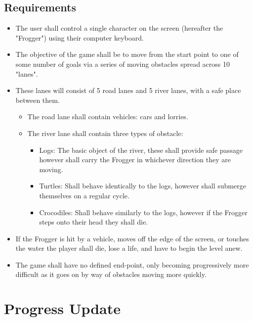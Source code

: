 \documentclass[12pt, a4paper]{report}
\begin{document}
\subsection{Requirements}
\begin{itemize}
  \item The user shall control a single character on the screen (hereafter the "Frogger") using their computer keyboard.
  \item The objective of the game shall be to move from the start point to one of some number of goals via a series of moving obstacles spread across 10 "lanes".
  \item These lanes will consist of 5 road lanes and 5 river lanes, with a safe place between them.
    \begin{itemize}
      \item The road lane shall contain vehicles: cars and lorries.
      \item The river lane shall contain three types of obstacle:
        \begin{itemize}
          \item Logs: The basic object of the river, these shall provide safe passage however shall carry the Frogger in whichever direction they are moving.
          \item Turtles: Shall behave identically to the logs, however shall submerge themselves on a regular cycle.
          \item Crocodiles: Shall behave similarly to the logs, however if the Frogger steps onto their head they shall die.
        \end{itemize}
    \end{itemize}
  \item If the Frogger is hit by a vehicle, moves off the edge of the screen, or touches the water the player shall die, lose a life, and have to begin the level anew.
  \item The game shall have no defined end-point, only becoming progressively more difficult as it goes on by way of obstacles moving more quickly.
\end{itemize}


\section{Progress Update}
\end{document}
